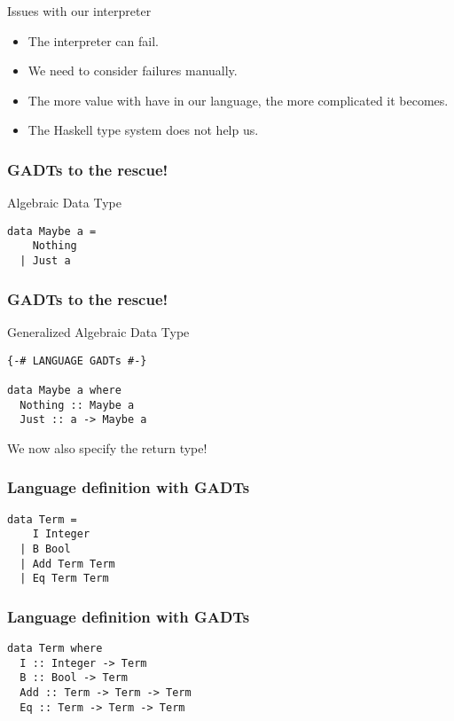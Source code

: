 \documentclass[pdftex,aspectratio=169]{beamer}
\begin{document}
\begin{frame}{Issues with our interpreter}
  \begin{itemize}[<+->]
\item The interpreter can fail.
\item We need to consider failures manually.
\item The more value with have in our language, the more complicated it becomes.
\item The Haskell type system does not help us.
\end{itemize}
\end{frame}

\begin{frame}[fragile]
  \frametitle{GADTs to the rescue!}

  \begin{block}{Algebraic Data Type}
    \begin{lstlisting}
data Maybe a =
    Nothing
  | Just a
\end{lstlisting}

  \end{block}
\end{frame}

\begin{frame}[fragile]
  \frametitle{GADTs to the rescue!}

  \begin{block}{Generalized Algebraic Data Type}
    \begin{lstlisting}
{-# LANGUAGE GADTs #-}

data Maybe a where
  Nothing :: Maybe a
  Just :: a -> Maybe a
\end{lstlisting}

  \end{block}\pause
We now also specify the return type!
\end{frame}

\begin{frame}[fragile]
  \frametitle{Language definition with GADTs}
  \begin{block}{}
    \begin{lstlisting}
data Term =
    I Integer
  | B Bool
  | Add Term Term
  | Eq Term Term      
    \end{lstlisting}
  \end{block}
\end{frame}

\begin{frame}[fragile]
  \frametitle{Language definition with GADTs}
  \begin{block}{}
    \begin{lstlisting}
data Term where
  I :: Integer -> Term
  B :: Bool -> Term
  Add :: Term -> Term -> Term
  Eq :: Term -> Term -> Term   
    \end{lstlisting}
  \end{block}
\end{frame}
\end{document}
